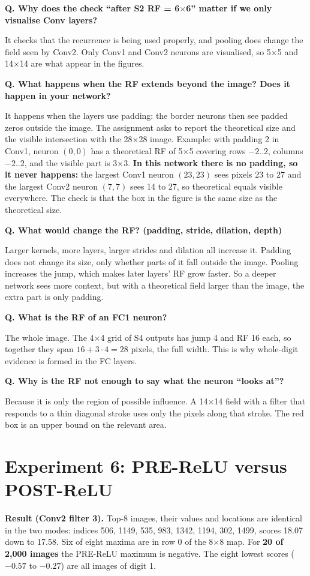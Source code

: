 \documentclass[11pt]{article}
\newcommand{\Q}[1]{\par\vspace{4pt}\noindent\textcolor{qcol}{\textbf{Q. #1}}\par\nopagebreak}
\newcommand{\A}[1]{\noindent #1\par}
\begin{document}
\Q{Why does the check ``after S2 RF = 6$\times$6'' matter if we only visualise Conv layers?}
\A{It checks that the recurrence is being used properly, and pooling does change the field seen by Conv2. Only Conv1 and Conv2 neurons are visualised, so 5$\times$5 and 14$\times$14 are what appear in the figures.}

\Q{What happens when the RF extends beyond the image? Does it happen in your network?}
\A{It happens when the layers use padding: the border neurons then see padded zeros outside the image. The assignment asks to report the theoretical size and the visible intersection with the 28$\times$28 image. Example: with padding 2 in Conv1, neuron $(0,0)$ has a theoretical RF of 5$\times$5 covering rows $-2..2$, columns $-2..2$, and the visible part is 3$\times$3. \textbf{In this network there is no padding, so it never happens:} the largest Conv1 neuron $(23,23)$ sees pixels 23 to 27 and the largest Conv2 neuron $(7,7)$ sees 14 to 27, so theoretical equals visible everywhere. The check is that the box in the figure is the same size as the theoretical size.}

\Q{What would change the RF? (padding, stride, dilation, depth)}
\A{Larger kernels, more layers, larger strides and dilation all increase it. Padding does not change its size, only whether parts of it fall outside the image. Pooling increases the jump, which makes later layers' RF grow faster. So a deeper network sees more context, but with a theoretical field larger than the image, the extra part is only padding.}

\Q{What is the RF of an FC1 neuron?}
\A{The whole image. The 4$\times$4 grid of S4 outputs has jump 4 and RF 16 each, so together they span $16+3\cdot4=28$ pixels, the full width. This is why whole-digit evidence is formed in the FC layers.}

\Q{Why is the RF not enough to say what the neuron ``looks at''?}
\A{Because it is only the region of possible influence. A 14$\times$14 field with a filter that responds to a thin diagonal stroke uses only the pixels along that stroke. The red box is an upper bound on the relevant area.}

\section{Experiment 6: PRE-ReLU versus POST-ReLU}

\textbf{Result (Conv2 filter 3).} Top-8 images, their values and locations are identical in the two modes: indices 506, 1149, 535, 983, 1342, 1194, 302, 1499, scores 18.07 down to 17.58. Six of eight maxima are in row 0 of the 8$\times$8 map. For \textbf{20 of 2,000 images} the PRE-ReLU maximum is negative. The eight lowest scores ($-0.57$ to $-0.27$) are all images of digit 1.
\end{document}
